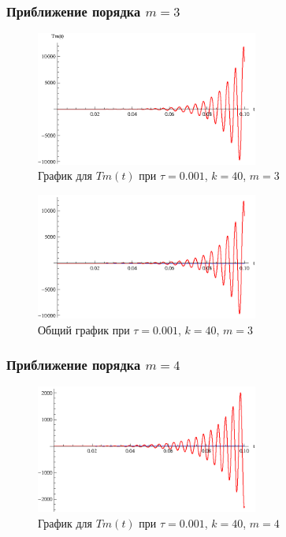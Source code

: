 \newpage

\subsubsection{Приближение порядка $m=3$}

\begin{figure}[h]
\begin{center}
\includegraphics[width=0.65\textwidth]{./3_results/4_6.eps}
\end{center}
\caption{График для $Tm(t)$ при $\tau=0.001$, $k=40$, $m=3$}
\end{figure}

\begin{figure}[h]
\begin{center}
\includegraphics[width=0.65\textwidth]{./3_results/4_7.eps}
\end{center}
\caption{Общий график при $\tau=0.001$, $k=40$, $m=3$}
\end{figure}

\newpage

\subsubsection{Приближение порядка $m=4$}

\begin{figure}[h]
\begin{center}
\includegraphics[width=0.65\textwidth]{./3_results/4_8.eps}
\end{center}
\caption{График для $Tm(t)$ при $\tau=0.001$, $k=40$, $m=4$}
\end{figure}

